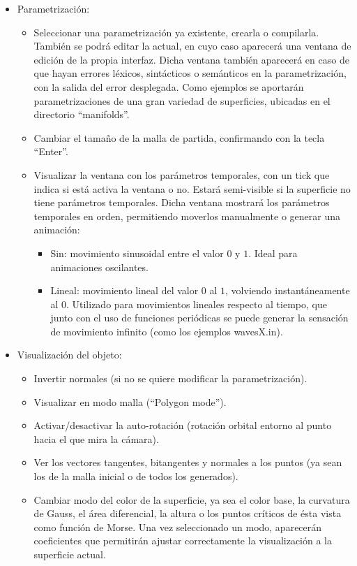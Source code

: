 \begin{itemize}
	\item Parametrización:
	\begin{itemize}
		\item Seleccionar una parametrización ya existente, crearla o compilarla. También se podrá editar la actual, en cuyo caso aparecerá una ventana de edición de la propia interfaz. Dicha ventana también aparecerá en caso de que hayan errores léxicos, sintácticos o semánticos en la parametrización, con la salida del error desplegada. Como ejemplos se aportarán parametrizaciones de una gran variedad de superficies, ubicadas en el directorio ``manifolds''.
		\item Cambiar el tamaño de la malla de partida, confirmando con la tecla ``Enter''.
		\item Visualizar la ventana con los parámetros temporales, con un tick que indica si está activa la ventana o no. Estará semi-visible si la superficie no tiene parámetros temporales. Dicha ventana mostrará los parámetros temporales en orden, permitiendo moverlos manualmente o generar una animación:
		\begin{itemize}
			\item Sin: movimiento sinusoidal entre el valor $0$ y $1$. Ideal para animaciones oscilantes.
			\item Lineal: movimiento lineal del valor $0$ al $1$, volviendo instantáneamente al $0$. Utilizado para movimientos lineales respecto al tiempo, que junto con el uso de funciones periódicas se puede generar la sensación de movimiento infinito (como los ejemplos wavesX.in).
		\end{itemize}
	\end{itemize}
	\item Visualización del objeto:
	\begin{itemize}
		\item Invertir normales (si no se quiere modificar la parametrización).
		\item Visualizar en modo malla (``Polygon mode'').
		\item Activar/desactivar la auto-rotación (rotación orbital entorno al punto hacia el que mira la cámara).
		\item Ver los vectores tangentes, bitangentes y normales a los puntos (ya sean los de la malla inicial o de todos los generados).
		\item Cambiar modo del color de la superficie, ya sea el color base, la curvatura de Gauss, el área diferencial, la altura o los puntos críticos de ésta vista como función de Morse. Una vez seleccionado un modo, aparecerán coeficientes que permitirán ajustar correctamente la visualización a la superficie actual.

\end{itemize}
\end{itemize}
